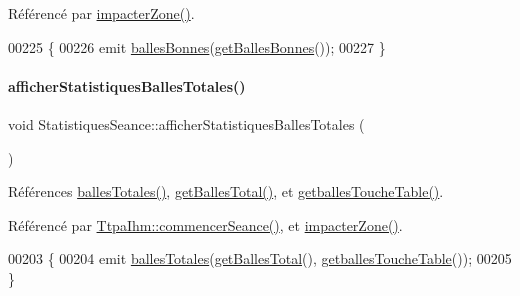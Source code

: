 Référencé par \hyperlink{class_statistiques_seance_adf93738ca1b6b117ac91b68772d2c4c8}{impacter\+Zone()}.


\begin{DoxyCode}
00225 \{
00226     emit \hyperlink{class_statistiques_seance_aa3ee6b00dae44d1f3cf78349ba235b08}{ballesBonnes}(\hyperlink{class_statistiques_seance_a0dad2ceb22672adf343548b35bf86ba1}{getBallesBonnes}());
00227 \}
\end{DoxyCode}
\mbox{\label{class_statistiques_seance_a216b30bcfca71e425073a7ac90e59089}} 
\paragraph{\texorpdfstring{afficher\+Statistiques\+Balles\+Totales()}{afficherStatistiquesBallesTotales()}}
{\footnotesize\ttfamily void Statistiques\+Seance\+::afficher\+Statistiques\+Balles\+Totales (\begin{DoxyParamCaption}{ }\end{DoxyParamCaption})}



Références \hyperlink{class_statistiques_seance_ac3c52002d12dd7b93e6339126c84190f}{balles\+Totales()}, \hyperlink{class_statistiques_seance_aaefd0b775012ec914a36a262dc14fc66}{get\+Balles\+Total()}, et \hyperlink{class_statistiques_seance_a1f956e08733a81d0a86673cae6bc7feb}{getballes\+Touche\+Table()}.



Référencé par \hyperlink{class_ttpa_ihm_a9bf7a4cddbdbf786d781e4d084409068}{Ttpa\+Ihm\+::commencer\+Seance()}, et \hyperlink{class_statistiques_seance_adf93738ca1b6b117ac91b68772d2c4c8}{impacter\+Zone()}.


\begin{DoxyCode}
00203 \{
00204     emit \hyperlink{class_statistiques_seance_ac3c52002d12dd7b93e6339126c84190f}{ballesTotales}(\hyperlink{class_statistiques_seance_aaefd0b775012ec914a36a262dc14fc66}{getBallesTotal}(), 
      \hyperlink{class_statistiques_seance_a1f956e08733a81d0a86673cae6bc7feb}{getballesToucheTable}());
00205 \}
\end{DoxyCode}
\mbox{\label{class_statistiques_seance_aebc6dad0ca5e4f99b08378077eae2c20}} 
